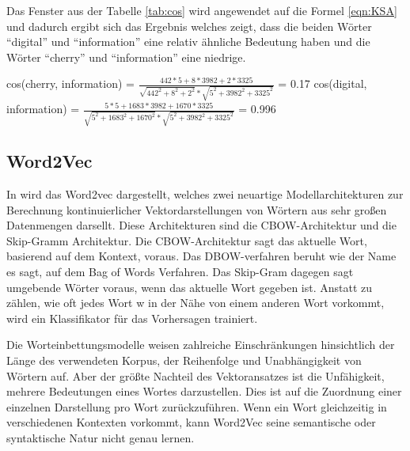 \documentclass[
        ngerman,
        paper=a4,
        numbers=noendperiod,
]{scrreprt}
\begin{document}
Das Fenster aus der Tabelle \ref{tab:cos} wird angewendet auf die Formel \ref{eqn:KSA} und dadurch ergibt sich das Ergebnis welches zeigt, dass die beiden Wörter \enquote{digital} und \enquote{information} eine relativ ähnliche Bedeutung haben und die Wörter \enquote{cherry} und \enquote{information} eine niedrige. 


\begin{xequation-} 
\centering cos(cherry, information) = $\frac{442\ast 5+8\ast3982+2\ast3325}{\sqrt{442^{2} +8^{2} +2^{2}}\ast \sqrt{5^{2} +3982^{2} +3325^{2}}}$ = 0.17
\newline
\newline
\centering cos(digital, information) = $\frac{5\ast 5+1683\ast3982+1670\ast3325}{\sqrt{5^{2} +1683^{2} +1670^{2}}\ast \sqrt{5^{2} +3982^{2} +3325^{2}}}$ = 0.996 
\end{xequation-} 




\subsection{Word2Vec}
In \citep{mikolov2013efficient} wird das Word2vec dargestellt, welches zwei neuartige Modellarchitekturen zur Berechnung kontinuierlicher Vektordarstellungen von Wörtern aus sehr großen Datenmengen darsellt. Diese Architekturen sind die  CBOW-Architektur und die Skip-Gramm Architektur. Die CBOW-Architektur sagt das aktuelle Wort, basierend auf dem Kontext, voraus. Das DBOW-verfahren beruht wie der Name es sagt, auf dem Bag of Words Verfahren. Das Skip-Gram dagegen sagt umgebende Wörter voraus, wenn das aktuelle Wort gegeben ist. Anstatt zu zählen, wie oft jedes Wort w in der Nähe von einem anderen Wort vorkommt, wird ein Klassifikator für das Vorhersagen trainiert. 


Die Worteinbettungsmodelle weisen zahlreiche Einschränkungen hinsichtlich der Länge des verwendeten Korpus, der Reihenfolge und Unabhängigkeit von Wörtern auf. Aber der größte Nachteil des Vektoransatzes ist die Unfähigkeit, mehrere Bedeutungen eines Wortes darzustellen. Dies ist auf die Zuordnung einer einzelnen Darstellung pro Wort zurückzuführen. Wenn ein Wort gleichzeitig in verschiedenen Kontexten vorkommt, kann Word2Vec seine semantische oder syntaktische Natur nicht genau lernen.





\end{document}
